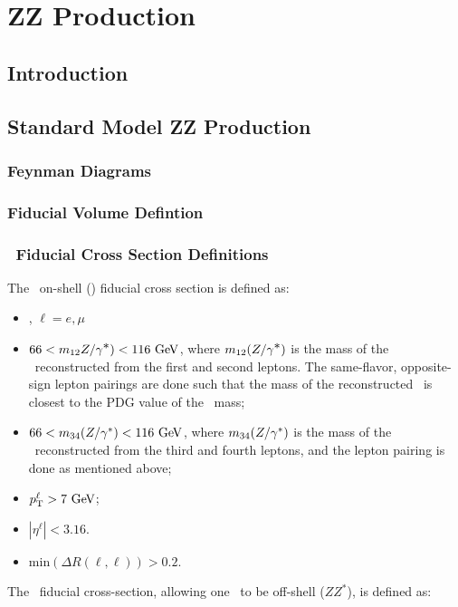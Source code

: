 \graphicspath{{Chapters/TheoryZZProduction/Figures/}}
\chapter{ZZ Production}
\label{chap:TheoryZZProduction}

\section{Introduction}
\section{Standard Model ZZ Production}
\subsection{Feynman Diagrams}
\subsection{Fiducial Volume Defintion}

\subsection{\zzllll\ Fiducial Cross Section Definitions}

The \zzllll\ on-shell (\ZZ) fiducial cross section is defined as:
\begin{itemize}
\item{\ZorgZorglplmlplm, $\ell = e,\mu$}
\item{ $66 < m_{12}\Zorgv) <  116\GeV$, where $m_{12}(Z/\gamma^{\textstyle *})$ is
the mass of the \Z\ reconstructed from the first and second leptons.  The
same-flavor, opposite-sign lepton pairings are done such that the mass of the 
reconstructed \Z\ is closest to the PDG value of the \Z\ mass;}
\item{ $66 < m_{34}(\Z/\gamma^*) <  116\GeV$, where $m_{34}(Z/\gamma^*)$ is
the mass of the \Z\ reconstructed from the third and fourth leptons, and the
lepton pairing is done as mentioned above;}
\item $\pT^{\ell} > 7\GeV$;
\item $|\eta^{\ell}| < 3.16$.
\item{$\mathrm{min}(\Delta R(\ell,\ell)) > 0.2$.}
\end{itemize}

The \zzllll\ fiducial cross-section, allowing one \Z\ to be off-shell ($ZZ^*$), is defined as:

